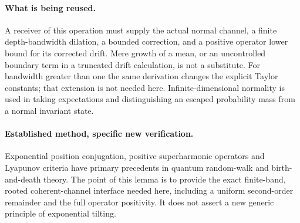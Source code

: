 \paragraph{What is being reused.}
A receiver of this operation must supply the actual normal channel, a finite
depth-bandwidth dilation, a bounded correction, and a positive operator lower
bound for its corrected drift. Mere growth of a mean, or an uncontrolled
boundary term in a truncated drift calculation, is not a substitute. For
bandwidth greater than one the same derivation changes the explicit Taylor
constants; that extension is not needed here. Infinite-dimensional normality
is used in taking expectations and distinguishing an escaped probability mass
from a normal invariant state.

\paragraph{Established method, specific new verification.}
Exponential position conjugation, positive superharmonic operators and
Lyapunov criteria have primary precedents in quantum random-walk and
birth-and-death theory. The point of this lemma is to provide the exact
finite-band, rooted coherent-channel interface needed here, including a
uniform second-order remainder and the full operator positivity. It does
not assert a new generic principle of exponential tilting.
